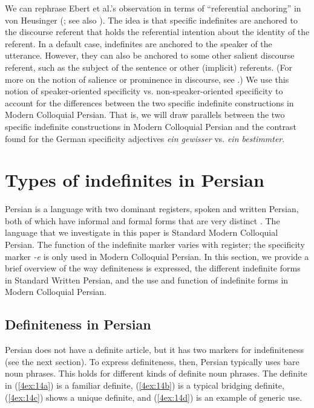 \documentclass[output=paper]{langsci/langscibook}
\begin{document}
We can rephrase Ebert et al.'s observation in terms of ``referential anchoring'' in von Heusinger (\citeyear{vonheus:02url,vonheus:11url}; see also \citealt{onea:geist:11}). The idea is that specific indefinites are anchored to the discourse referent that holds the referential intention about the identity of the referent. In a default case, indefinites are anchored to the speaker of the utterance. However, they can also be anchored to some other salient discourse referent, such as the subject of the sentence or other (implicit) referents. (For more on the notion of salience or prominence in discourse, see \citealt{vonheus:schum:19}.) We use this notion of speaker-oriented specificity vs. non-speaker-oriented specificity to account for the differences between the two specific indefinite constructions in Modern Colloquial Persian. That is, we will draw parallels between the two specific indefinite constructions in Modern Colloquial Persian and the contrast found for the German specificity adjectives {\emph{ein gewisser}} vs. {\emph{ein bestimmter}}.


\section{Types of indefinites in Persian}\label{4sec:3}
\largerpage[2]
Persian is a language with two dominant registers, spoken and written Persian, both of which have informal and formal forms that are very distinct \citep{jasbi:14, lazard:57, lazard:92, modarresi:18, nikravan:14, windfuhr:79}. The language that we investigate in this paper is Standard Modern Colloquial Persian. The function of the indefinite marker varies with register; the specificity marker {\emph{-e}} is only used in Modern Colloquial Persian. In this section, we provide a brief overview of the way definiteness is expressed, the different indefinite forms in Standard Written Persian, and the use and function of indefinite forms in Modern Colloquial Persian.

\subsection{Definiteness in Persian}\label{4sec:31}

Persian does not have a definite article, but it has two markers for indefiniteness (see the next section). To express definiteness, then, Persian typically uses bare noun phrases. This holds for different kinds of definite noun phrases. The definite in (\ref{4ex:14a}) is a familiar definite, (\ref{4ex:14b}) is a typical bridging definite, (\ref{4ex:14c}) shows a unique definite, and (\ref{4ex:14d}) is an example of generic use.
\end{document}
